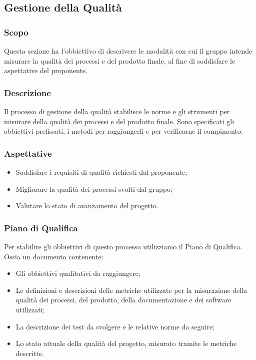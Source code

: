 \subsection{Gestione della Qualità}
\label{sec:gestione della qualità}

\subsubsection{Scopo}
Questa sezione ha l'obbiettivo di descrivere le modalità con cui il gruppo intende misurare la qualità dei processi e del prodotto finale, al fine di soddisfare le aspettative del proponente.

\subsubsection{Descrizione}
Il processo di gestione della qualità stabilisce le norme e gli strumenti per misurare della qualità dei processi e del prodotto finale. Sono specificati gli obbiettivi prefissati, i metodi per raggiungerli e per verificarne il compimento.

\subsubsection{Aspettative}
\begin{itemize}
    \item Soddisfare i requisiti di qualità richiesti dal proponente;
    \item Migliorare la qualità dei processi svolti dal gruppo;
    \item Valutare lo stato di avanzamento del progetto.
\end{itemize}

\subsubsection{Piano di Qualifica}
Per stabilire gli obbiettivi di questo processo utilizziamo il Piano di Qualifica. Ossia un documento contenente:
\begin{itemize}
    \item Gli obbiettivi qualitativi da raggiungere;
    \item Le definizioni e descrizioni delle metriche utilizzate per la misurazione della qualità dei processi, del prodotto, della documentazione e dei software utilizzati;
    \item La descrizione dei test da svolgere e le relative norme da seguire;
    \item Lo stato attuale della qualità del progetto, misurato tramite le metriche descritte.
\end{itemize}

